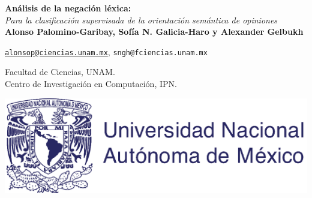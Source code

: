 \documentclass[a0,portrait]{a0poster}
\begin{document}


\begin{minipage}[b]{0.75\linewidth}
\veryHuge \color{NavyBlue} \textbf{Análisis de la negación léxica:} \color{Black}\\
\Huge\textit{Para la clasificación supervisada de la orientación semántica de opiniones}\\[0.5cm] 

\Large \textbf{Alonso Palomino-Garibay, Sofía N. Galicia-Haro y Alexander Gelbukh}%

\large \href{mailto:alonsop@ciencias.unam.mx}{\texttt{alonsop@ciencias.unam.mx}}, \hspace{0.2cm}\texttt{sngh@fciencias.unam.mx}

\Large Facultad de Ciencias, UNAM.\\
\Large Centro de Investigación en Computación, IPN.
\\

\end{minipage}
\begin{minipage}[b]{0.25\linewidth}


\hspace*{-11cm}\includegraphics[width=25cm]{escudo.png} 


\end{minipage}
\end{document}
